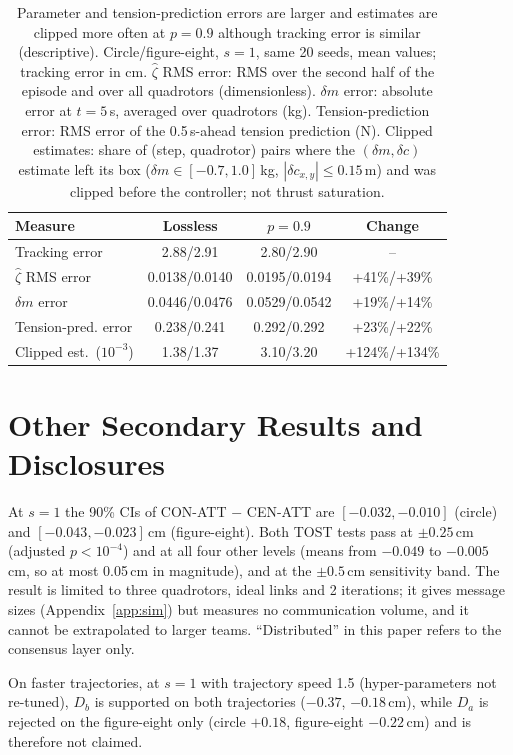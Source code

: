 \documentclass[conference]{IEEEtran}
\begin{document}
\begin{table}[t]
\centering
\caption{Parameter and tension-prediction errors are larger and estimates are clipped more often at $p=0.9$ although tracking error is similar (descriptive). Circle/figure-eight, $s{=}1$, same 20 seeds, mean values; tracking error in cm. $\hat\zeta$ RMS error: RMS over the second half of the episode and over all quadrotors (dimensionless). $\delta m$ error: absolute error at $t{=}5$\,s, averaged over quadrotors (kg). Tension-prediction error: RMS error of the 0.5\,s-ahead tension prediction (N). Clipped estimates: share of (step, quadrotor) pairs where the $(\delta m,\delta c)$ estimate left its box ($\delta m\in[-0.7,1.0]$\,kg, $|\delta c_{x,y}|\le0.15$\,m) and was clipped before the controller; not thrust saturation.}
\label{tab:loss}
\footnotesize
\setlength{\tabcolsep}{3pt}
\begin{tabular}{lccc}
\toprule
Measure & Lossless & $p=0.9$ & Change \\
\midrule
Tracking error & 2.88/2.91 & 2.80/2.90 & -- \\
$\hat\zeta$ RMS error & 0.0138/0.0140 & 0.0195/0.0194 & +41\%/+39\% \\
$\delta m$ error & 0.0446/0.0476 & 0.0529/0.0542 & +19\%/+14\% \\
Tension-pred. error & 0.238/0.241 & 0.292/0.292 & +23\%/+22\% \\
Clipped est.\ ($10^{-3}$) & 1.38/1.37 & 3.10/3.20 & +124\%/+134\% \\
\bottomrule
\end{tabular}
\end{table}

\section{Other Secondary Results and Disclosures}\label{app:other}
At $s=1$ the 90\% CIs of CON-ATT $-$ CEN-ATT are $[-0.032,-0.010]$ (circle) and $[-0.043,-0.023]$\,cm (figure-eight). Both TOST tests pass at $\pm0.25$\,cm (adjusted $p<10^{-4}$) and at all four other levels (means from $-0.049$ to $-0.005$\,cm, so at most 0.05\,cm in magnitude), and at the $\pm0.5$\,cm sensitivity band. The result is limited to three quadrotors, ideal links and 2 iterations; it gives message sizes (Appendix~\ref{app:sim}) but measures no communication volume, and it cannot be extrapolated to larger teams. ``Distributed'' in this paper refers to the consensus layer only.

On faster trajectories, at $s=1$ with trajectory speed 1.5 (hyper-parameters not re-tuned), $D_b$ is supported on both trajectories ($-0.37$, $-0.18$\,cm), while $D_a$ is rejected on the figure-eight only (circle $+0.18$, figure-eight $-0.22$\,cm) and is therefore not claimed.
\end{document}
